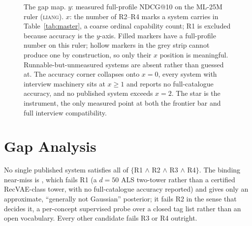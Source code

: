 \documentclass[acmsmall,review,anonymous]{acmart}
\begin{document}
\begin{figure}[t]
\caption{The gap map. $y$: measured full-profile NDCG@10 on the ML-25M ruler (\textsc{liang}). $x$: the number of R2--R4 marks a system carries in Table~\ref{tab:master}, a coarse ordinal capability count; R1 is excluded because accuracy is the $y$-axis. Filled markers have a full-profile number on this ruler; hollow markers in the grey strip cannot produce one by construction, so only their $x$ position is meaningful. Runnable-but-unmeasured systems are absent rather than guessed at. The accuracy corner collapses onto $x{=}0$, every system with interview machinery sits at $x\ge1$ and reports no full-catalogue accuracy, and no published system exceeds $x{=}2$. The star is the instrument, the only measured point at both the frontier bar and full interview compatibility.}
\label{fig:gapmap}
\end{figure}

\section{Gap Analysis}\label{sec:gap}

No single published system satisfies all of $\{$R1 $\wedge$ R2 $\wedge$ R3 $\wedge$ R4$\}$. The binding near-miss is \citet{biyik2023soft}, which fails R1 (a $d{=}50$ ALS two-tower rather than a certified RecVAE-class tower, with no full-catalogue accuracy reported) and gives only an approximate, ``generally not Gaussian'' posterior; it fails R2 in the sense that decides it, a per-concept supervised probe over a closed tag list rather than an open vocabulary. Every other candidate fails R3 or R4 outright.
\end{document}
